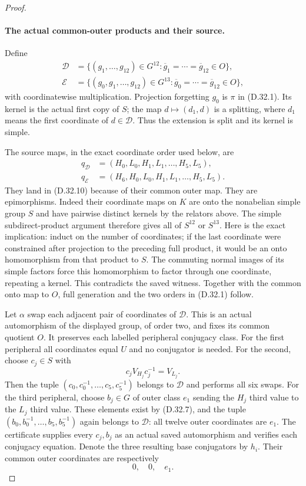\begin{proof}
\paragraph{The actual common-outer products and their source.}
Define
\[
 \begin{split}
 \mathcal D
   &=\{(g_1,\ldots,g_{12})\in G^{12}:
                  \overline g_1=\cdots=\overline g_{12}\in O\},\\
 \mathcal E
   &=\{(g_0,g_1,\ldots,g_{12})\in G^{13}:
                  \overline g_0=\cdots=\overline g_{12}\in O\},
 \end{split}
 \tag{D.32.10}
\]
with coordinatewise multiplication.
Projection forgetting $g_0$ is
$\pi$ in \textup{(D.32.1)}.
Its kernel is the actual first
copy of $S$; the map
$d\mapsto(d_1,d)$ is a splitting,
where $d_1$ means the first
coordinate of $d\in\mathcal D$.
Thus the extension is split and
its kernel is simple.

The source maps, in the exact
coordinate order used below, are
\[
 \begin{split}
 q_{\mathcal D}
   &=(H_0,L_0,H_1,L_1,\ldots,H_5,L_5),\\
 q_{\mathcal E}
   &=(H_6,H_0,L_0,H_1,L_1,\ldots,H_5,L_5).
 \end{split}
 \tag{D.32.11}
\]
They land in \textup{(D.32.10)}
because of their common outer
map.  They are epimorphisms.
Indeed their coordinate maps on
$K$ are onto the nonabelian
simple group $S$ and have
pairwise distinct kernels by
the relators above.
The simple subdirect-product
argument therefore gives all
of $S^{12}$ or $S^{13}$.
Here is the exact implication:
induct on the number of
coordinates; if the last
coordinate were constrained
after projection to the preceding
full product, it would be an
onto homomorphism from that
product to $S$.  The commuting
normal images of its simple
factors force this homomorphism
to factor through one coordinate,
repeating a kernel.  This
contradicts the saved witness.
Together with the common onto
map to $O$, full generation
and the two orders in
\textup{(D.32.1)} follow.

Let $\alpha$ swap each adjacent
pair of coordinates of
$\mathcal D$.
This is an actual automorphism
of the displayed group, of
order two, and fixes its
common quotient $O$.
It preserves each labelled
peripheral conjugacy class.
For the first peripheral all
coordinates equal $U$ and
no conjugator is needed.
For the second, choose
$c_j\in S$ with
\[
 c_j V_{H_j}c_j^{-1}=V_{L_j}.
 \tag{D.32.12}
\]
Then the tuple
$(c_0,c_0^{-1},\ldots,c_5,c_5^{-1})$
belongs to $\mathcal D$ and
performs all six swaps.
For the third peripheral,
choose $b_j\in G$ of outer
class $e_1$ sending the
$H_j$ third value to the
$L_j$ third value.
These elements exist by
\textup{(D.32.7)}, and the
tuple $(b_0,b_0^{-1},\ldots,b_5,b_5^{-1})$
again belongs to $\mathcal D$:
all twelve outer coordinates
are $e_1$.
The certificate supplies every
$c_j,b_j$ as an actual saved
automorphism and verifies
each conjugacy equation.
Denote the three resulting
base conjugators by $h_i$.
Their common outer coordinates
are respectively
\[
                           0,\quad0,\quad e_1.
 \tag{D.32.13}
\]


\end{proof}
